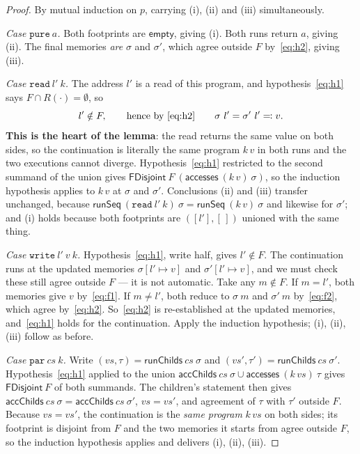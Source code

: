 \documentclass[11pt,a4paper]{article}
\theoremstyle{definition}
\theoremstyle{plain}
\theoremstyle{remark}
\newcommand{\st}{\sigma}
\newcommand{\reads}[1]{R(#1)}
\newcommand{\acc}{\mathsf{accesses}}
\newcommand{\runSeq}{\mathsf{runSeq}}
\newcommand{\upd}[3]{#1[#2 \mapsto #3]}
\begin{document}
\begin{proof}
By mutual induction on $p$, carrying (i), (ii) and (iii) simultaneously.

\emph{Case $\texttt{pure}\ a$.} Both footprints are $\mathsf{empty}$, giving (i). Both runs
return $a$, giving (ii). The final memories \emph{are} $\st$ and $\st'$, which agree outside
$F$ by~\eqref{eq:h2}, giving (iii).

\emph{Case $\texttt{read}\ l'\ k$.} The address $l'$ is a read of this program, and
hypothesis~\eqref{eq:h1} says $F \cap \reads{\cdot} = \emptyset$, so
\[
  l' \notin F, \qquad\text{hence by~\eqref{eq:h2}}\qquad \st\ l' = \st'\ l' \eqqcolon v .
\]
\textbf{This is the heart of the lemma}: the read returns the same value on both sides, so
the continuation is literally the same program $k\,v$ in both runs and the two executions
cannot diverge. Hypothesis~\eqref{eq:h1} restricted to the second summand of the union gives
$\mathsf{FDisjoint}\ F\ (\acc\ (k\,v)\ \st)$, so the induction hypothesis applies to $k\,v$
at $\st$ and $\st'$. Conclusions (ii) and (iii) transfer unchanged, because
$\runSeq\ (\texttt{read}\ l'\ k)\ \st = \runSeq\ (k\,v)\ \st$ and likewise for $\st'$; and
(i) holds because both footprints are $([l'],[\,])$ unioned with the same thing.

\emph{Case $\texttt{write}\ l'\ v\ k$.} Hypothesis~\eqref{eq:h1}, write half, gives
$l' \notin F$. The continuation runs at the updated memories $\upd{\st}{l'}{v}$ and
$\upd{\st'}{l'}{v}$, and we must check these still agree outside $F$ --- it is not
automatic. Take any $m \notin F$. If $m = l'$, both memories give $v$ by~\eqref{eq:f1}. If
$m \neq l'$, both reduce to $\st\ m$ and $\st'\ m$ by~\eqref{eq:f2}, which agree
by~\eqref{eq:h2}. So~\eqref{eq:h2} is re-established at the updated memories,
and~\eqref{eq:h1} holds for the continuation. Apply the induction hypothesis; (i), (ii),
(iii) follow as before.

\emph{Case $\texttt{par}\ cs\ k$.} Write $(vs,\tau) = \mathsf{runChilds}\ cs\ \st$ and
$(vs',\tau') = \mathsf{runChilds}\ cs\ \st'$. Hypothesis~\eqref{eq:h1} applied to the union
$\mathsf{accChilds}\ cs\ \st \cup \acc\ (k\,vs)\ \tau$ gives $\mathsf{FDisjoint}\ F$ of both
summands. The children's statement then gives
$\mathsf{accChilds}\ cs\ \st = \mathsf{accChilds}\ cs\ \st'$, $vs = vs'$, and agreement of
$\tau$ with $\tau'$ outside $F$. Because $vs = vs'$, the continuation is the \emph{same
program} $k\,vs$ on both sides; its footprint is disjoint from $F$ and the two memories it
starts from agree outside $F$, so the induction hypothesis applies and delivers (i), (ii),
(iii).


\end{proof}
\end{document}
